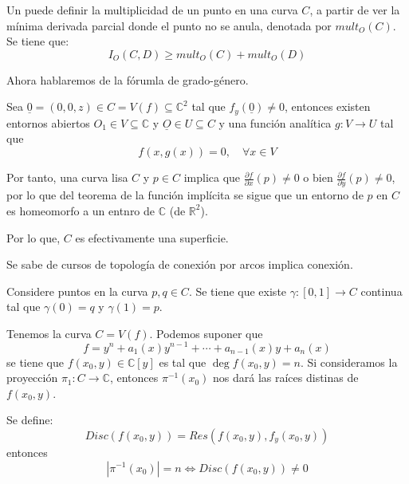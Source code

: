 \documentclass[12pt]{report}
\newcounter{it}
\theoremstyle{largebreak}
\newcommand\abs[1]{\ensuremath{\left|#1\right|}}
\newcommand\cf[3]{\ensuremath{#1:#2\rightarrow#3}}
\begin{document}
    Un puede definir la multiplicidad de un punto en una curva $C$, a partir de ver la mínima derivada parcial donde el punto no se anula, denotada por $mult_O(C)$. Se tiene que:
    \begin{equation*}
        I_O(C,D)\geq mult_O(C)+mult_O(D)
    \end{equation*}

    Ahora hablaremos de la fórumla de grado-género.

    \begin{theor}
        Sea $\underline{0}=(0,0,z)\in C=V(f)\subseteq\mathbb{C}^2$ tal que $f_y(\underline{0})\neq0$, entonces existen entornos abiertos $O_1\in V\subseteq \mathbb{C}$ y $\underline{O}\in U\subseteq C$ y una función analítica $\cf{g}{V}{U}$ tal que
        \begin{equation*}
            f(x,g(x))=0,\quad\forall x\in V
        \end{equation*}
    \end{theor}

    Por tanto, una curva lisa $C$ y $p\in C$ implica que $\frac{\partial f}{\partial x}(p)\neq 0$ o bien $\frac{\partial f}{\partial y}(p)\neq0$, por lo que del teorema de la función implícita se sigue que un entorno de $p$ en $C$ es homeomorfo a un entnro de $\mathbb{C}$ (de $\mathbb{R}^2$).
    
    Por lo que, $C$ es efectivamente una superficie.

    Se sabe de cursos de topología de conexión por arcos implica conexión.

    Considere puntos en la curva $p,q\in C$. Se tiene que existe $\cf{\gamma}{[0,1]}{C}$ continua tal que $\gamma(0)=q$ y $\gamma(1)=p$.

    Tenemos la curva $C=V(f)$. Podemos suponer que
    \begin{equation*}
        f=y^n+a_1(x)y^{ n-1}+\cdots+a_{ n-1}(x)y+a_n(x)
    \end{equation*}
    se tiene que $f(x_0,y)\in\mathbb{C}[y]$ es tal que $\deg f(x_0,y)=n$. Si consideramos la proyección $\cf{\pi_1}{C}{\mathbb{C}}$, entonces $\pi^{-1}(x_0)$ nos dará las raíces distinas de $f(x_0,y)$.

    Se define:
    \begin{equation*}
        Disc(f(x_0,y))=Res(f(x_0,y),f_y(x_0,y))
    \end{equation*}
    entonces
    \begin{equation*}
        \abs{\pi^{-1}(x_0)}=n\iff Disc(f(x_0,y))\neq0
    \end{equation*}
\end{document}
